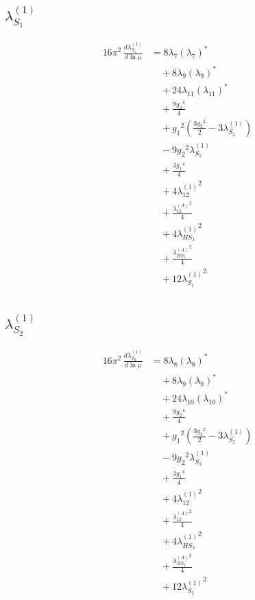 \documentclass[10pt,a4paper]{article}
\begin{document}
\subsection*{$\lambda_{S_1}^{(1)}$}
\begin{align*}
16\pi^2\,\frac{d \lambda_{S_1}^{(1)}}{d\ln\mu} &=8 {\lambda_{7}} \left({\lambda_{7}}\right)^{*} \\
&\quad +8 {\lambda_{9}} \left({\lambda_{9}}\right)^{*} \\
&\quad +24 {\lambda_{11}} \left({\lambda_{11}}\right)^{*} \\
&\quad +\frac{9 {g_2}^4}{4} \\
&\quad +{g_1}^2 \left(\frac{3 {g_2}^2}{2}-3 {\lambda_{S_1}^{(1)}}\right) \\
&\quad -9 {g_2}^2 {\lambda_{S_1}^{(1)}} \\
&\quad +\frac{3 {g_1}^4}{4} \\
&\quad +4 {\lambda_{12}^{(1)}}^2 \\
&\quad +\frac{{\lambda_{12}^{(A)}}^2}{4} \\
&\quad +4 {\lambda_{HS_1}^{(1)}}^2 \\
&\quad +\frac{{\lambda_{HS_1}^{(A)}}^2}{4} \\
&\quad +12 {\lambda_{S_1}^{(1)}}^2 \\
\end{align*}
\subsection*{$\lambda_{S_2}^{(1)}$}
\begin{align*}
16\pi^2\,\frac{d \lambda_{S_2}^{(1)}}{d\ln\mu} &=8 {\lambda_{8}} \left({\lambda_{8}}\right)^{*} \\
&\quad +8 {\lambda_{9}} \left({\lambda_{9}}\right)^{*} \\
&\quad +24 {\lambda_{10}} \left({\lambda_{10}}\right)^{*} \\
&\quad +\frac{9 {g_2}^4}{4} \\
&\quad +{g_1}^2 \left(\frac{3 {g_2}^2}{2}-3 {\lambda_{S_2}^{(1)}}\right) \\
&\quad -9 {g_2}^2 {\lambda_{S_2}^{(1)}} \\
&\quad +\frac{3 {g_1}^4}{4} \\
&\quad +4 {\lambda_{12}^{(1)}}^2 \\
&\quad +\frac{{\lambda_{12}^{(A)}}^2}{4} \\
&\quad +4 {\lambda_{HS_2}^{(1)}}^2 \\
&\quad +\frac{{\lambda_{HS_2}^{(A)}}^2}{4} \\
&\quad +12 {\lambda_{S_2}^{(1)}}^2 \\
\end{align*}
\end{document}
